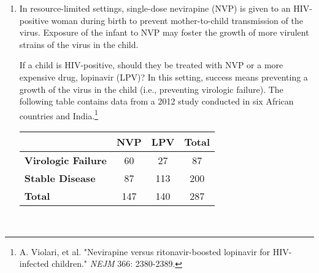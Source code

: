 \documentclass[letterpaper,12pt,twoside,]{pinp}
\begin{document}
\begin{enumerate}
\def\labelenumi{\arabic{enumi}.}
\setcounter{enumi}{2}
\item
  In resource-limited settings, single-dose nevirapine (NVP) is given to
  an HIV-positive woman during birth to prevent mother-to-child
  transmission of the virus. Exposure of the infant to NVP may foster
  the growth of more virulent strains of the virus in the child.

  If a child is HIV-positive, should they be treated with NVP or a more
  expensive drug, lopinavir (LPV)? In this setting, success means
  preventing a growth of the virus in the child (i.e., preventing
  virologic failure). The following table contains data from a 2012
  study conducted in six African countries and
  India.\footnote{A. Violari, et al. "Nevirapine versus ritonavir-boosted lopinavir for HIV-infected children." \textit{NEJM} 366: 2380-2389.}

  \begin{center}
  \begin{tabular}{l|cc|c} 
  & \textbf{NVP} & \textbf{LPV} & \textbf{Total}\\ \hline
    \textbf{Virologic Failure} & 60 & 27 & 87  \\
    \textbf{Stable Disease} & 87 & 113 & 200 \\ \hline
    \textbf{Total} & 147 & 140 & 287  \\ 
  \end{tabular}\\
  \end{center}

  \vspace{0.5cm}


\end{enumerate}
\end{document}
